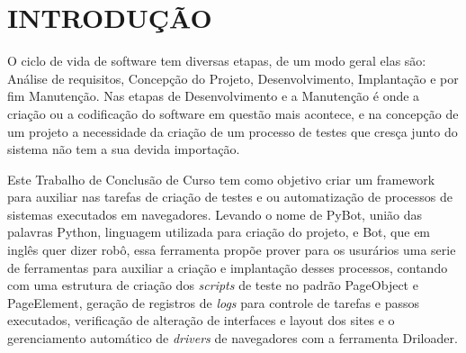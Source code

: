 %
%

\chapter{INTRODUÇÃO}\label{chap:introducao}

O ciclo de vida de software tem diversas etapas, de um modo geral elas são: Análise de requisitos, Concepção do Projeto, Desenvolvimento, Implantação e por fim Manutenção.
Nas etapas de Desenvolvimento e a Manutenção é onde a criação ou a codificação do software em questão mais acontece, e na concepção de um projeto a necessidade da criação
de um processo de testes que cresça junto do sistema não tem a sua devida importação.


Este Trabalho de Conclusão de Curso tem como objetivo criar um framework para auxiliar nas tarefas de criação de testes e ou automatização de processos de sistemas executados em navegadores.
Levando o nome de PyBot, união das palavras Python, linguagem utilizada para criação do projeto, e Bot, que em inglês quer dizer robô, essa ferramenta propõe prover para os usurários uma serie
de ferramentas para auxiliar a criação e implantação desses processos, contando com uma estrutura de criação dos \emph{scripts} de teste no padrão PageObject e PageElement, geração de registros de
\emph{logs} para controle de tarefas e passos executados, verificação de alteração de interfaces e layout dos sites e o gerenciamento automático de \emph{drivers} de navegadores com a ferramenta Driloader.